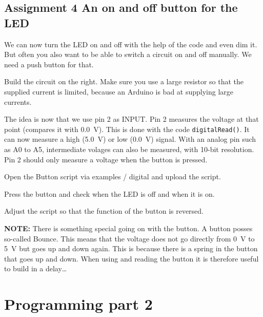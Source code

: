\documentclass{arduino}
\begin{document}
\subsection{Assignment 4 An on and off button for the LED}


We can now turn the LED on and off with the help of the code and even dim it. But often you also want to be able to switch a circuit on and off manually. We need a push button for that.

\begin{alphalist}
\item Build the circuit on the right. Make sure you use a large resistor so that the supplied current is limited, because an Arduino is bad at supplying large currents.
\end{alphalist}

The idea is now that we use pin 2 as INPUT. Pin 2 measures the voltage at that point (compares it with \SI{0.0}{\volt}). This is done with the code \lstinline{digitalRead()}. It can now measure a high (\SI{5.0}{\volt}) or low (\SI{0.0}{\volt}) signal. With an analog pin such as A0 to A5, intermediate volages can also be measured, with 10-bit resolution. Pin 2 should only measure a voltage when the button is pressed.

\begin{alphalist}
\item Open the Button script via examples / digital and upload the script.

\item Press the button and check when the LED is off and when it is on.

\item Adjust the script so that the function of the button is reversed.
\end{alphalist}


\textbf{NOTE:} There is something special going on with the button. A button posses so-called Bounce. This means that the voltage does not go directly from \SI{0}{\volt} to \SI{5}{\volt} but goes up and down again. This is because there is a spring in the button that goes up and down. When using and reading the button it is therefore useful to build in a delay\dots

\newpage

\section{Programming part 2}
\end{document}
